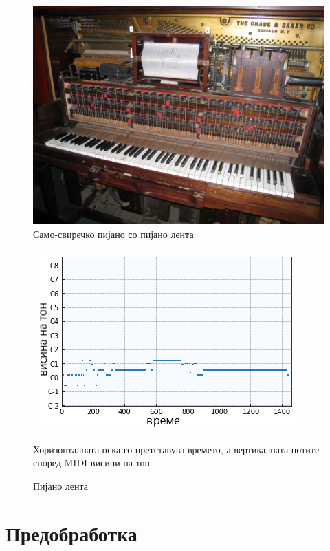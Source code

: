 \begin{figure}[H]
	\centering
\includegraphics[scale=.236]{images/piano.jpeg}
	\caption{Само-свиречко пијано со пијано лента}
	\label{fig:piano_pr}
\end{figure}

\begin{figure}[H]
	\centering
\includegraphics[scale=1.12]{images/piano_roll.png}
	\caption{Пијано лента}
	Хоризонталната оска го претставува времето, а вертикалната нотите според MIDI висини на тон
	\label{fig:piano_roll}
\end{figure}

\section{Предобработка}

